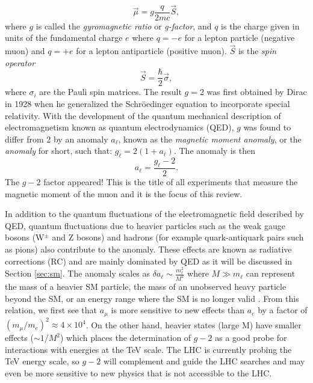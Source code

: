 \documentclass{outhesis}
\begin{document}
\begin{equation}
\overrightarrow{\mu} = g\frac{q}{2mc}\overrightarrow{S},
\label{eq:mu}
\end{equation}
where $g$ is called the \emph{gyromagnetic ratio} or \emph{g-factor}, and $q$ is the charge given in units of the fundamental charge $e$ where $q = -e$ for a lepton particle (negative muon) and $q = +e$ for a lepton antiparticle (positive muon). $\overrightarrow{S}$ is the \emph{spin operator}
\begin{equation}
\overrightarrow{S} = \frac{\hbar}{2}\overrightarrow{\sigma},
\end{equation} 
where $\sigma_i$ are the Pauli spin matrices. 
The result $g = 2$ was first obtained by Dirac in 1928 when he generalized the Schr\"{o}edinger equation to incorporate special relativity. With the development of the quantum mechanical description of electromagnetism known as quantum electrodynamics (QED), $g$ was found to differ from 2 by an anomaly $a_\ell$, known as the  \emph{magnetic moment anomaly}, or the \emph{anomaly} for short, such that: $g_\ell = 2(1+a_\ell)$. The anomaly is then
\begin{equation}
a_{\ell} = \frac{g_\ell-2}{2}.
\end{equation}
The $g-2$ factor appeared! This is the title of all experiments that measure the magnetic moment of the muon and it is the focus of this review.

In addition to the quantum fluctuations of the electromagnetic field described by QED, quantum fluctuations due to heavier particles such as the weak gauge bosons (W$^{\pm}$ and Z bosons) and hadrons (for example quark-antiquark pairs such as pions) also contribute to the anomaly. These effects are known as radiative corrections (RC) and are mainly dominated by QED as it will be discussed in Section \ref{sec:sm}. The anomaly scales as $\delta a_\ell \sim \frac{m_\ell^2}{M^2}$  where $M\gg m_\ell$ can represent the mass of a heavier SM particle, the mass of an unobserved heavy particle beyond the SM, or an energy range where the SM is no longer valid \cite{phen}. From this relation, we first see that $a_{\mu}$ is more sensitive to new effects than $a_e$ by a factor of $\left(m_{\mu}/m_e\right)^2 \approx 4 \times 10^4$. On the other hand, heavier states (large M) have smaller effects ($\sim 1/M^2$) which places the determination of $g-2$ as a good probe for interactions with energies at the TeV scale. The LHC is currently probing the TeV energy scale, so $g-2$ will complement and guide the LHC searches and may even be more sensitive to new physics that is not accessible to the LHC. 
\end{document}

